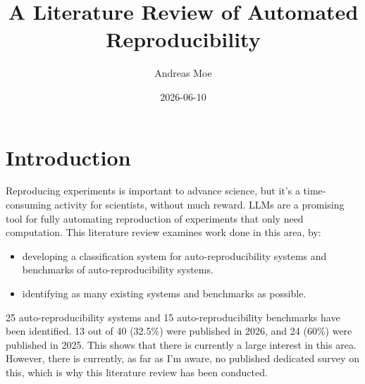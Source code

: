 \documentclass[8pt,a4paper]{article}
\title{A Literature Review of Automated Reproducibility}
\author{Andreas Moe}
\date{2026-06-10}
\begin{document}
\maketitle

\section{Introduction}
Reproducing experiments is important to advance science, but it's a time-consuming activity for scientists, without much reward.
LLMs are a promising tool for fully automating reproduction of experiments that only need computation.
This literature review examines work done in this area, 
by:
\begin{itemize}
    \item developing a classification system for auto-reproducibility systems and benchmarks of auto-reproducibility systems.
    \item identifying as many existing systems and benchmarks as possible.
\end{itemize}
25 auto-reproducibility systems and 15 auto-reproducibility benchmarks have been identified.
13 out of 40 (32.5\%) were published in 2026, and 24 (60\%) were published in 2025.
This shows that there is currently a large interest in this area.
However, there is currently, as far as I'm aware, no published dedicated survey on this, which is why this literature review has been conducted.
\end{document}
